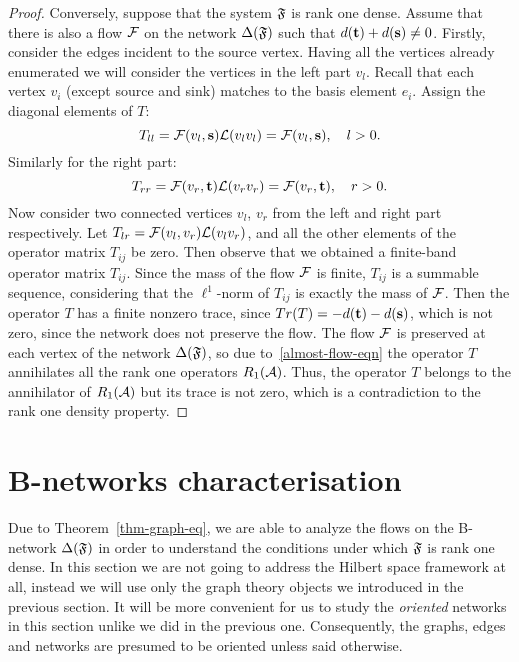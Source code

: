\documentclass[12pt,oneside,a4paper]{amsart}
\begin{document}
\begin{proof}
        Conversely, suppose that the system $\fsys$ is rank one dense.
        Assume that there is also a flow $\flow$ on the network $\net(\fsys)$ such that $d(\sink) + d(\source) \neq 0$.
        Firstly, consider the edges incident to the source vertex.
        Having all the vertices already enumerated we will consider the vertices in the left part $v_{l}$.
        Recall that each vertex $v_i$ (except source and sink) matches to the basis element $e_i$.
        Assign the diagonal elements of $T$:
        \[
          T_{ll} = \flow(v_l, \source) \len(v_l v_l) = \flow(v_l, \source), \quad l > 0.
        \]
        Similarly for the right part:
        \[
          T_{rr} = \flow(v_r, \sink) \len(v_r v_r) = \flow(v_r, \sink), \quad r > 0.
        \]
        Now consider two connected vertices $v_l$, $v_r$ from the left and right part respectively.
        Let $T_{lr} = \flow(v_l, v_r) \len(v_l  v_r)$,
        and all the other elements of the operator matrix $T_{ij}$ be zero.
        Then observe that we obtained a finite-band operator matrix $T_{ij}$.
        Since the mass of the flow $\flow$ is finite, $T_{ij}$ is a summable sequence, considering that
          the $\ell^1$-norm of $T_{ij}$ is exactly the mass of $\flow$.
        Then the operator $T$ has a finite nonzero trace, since $Tr(T) = -d(\sink) - d(\source)$, which is not zero,
          since the network does not preserve the flow.
        The flow $\flow$ is preserved at each vertex of the network $\net(\fsys)$, so due to~\eqref{almost-flow-eqn}
          the operator $T$ annihilates all the rank one operators $R_1(\cal{A})$.
        Thus, the operator $T$ belongs to the annihilator of $R_1(\cal{A})$ but its trace is not zero,
          which is a contradiction to the rank one density property.
      \end{proof}

  \bigskip
  \section{B-networks characterisation}
    \label{sec:char}
    Due to Theorem~\ref{thm-graph-eq}, we are able to analyze the flows on the B-network
      $\net(\fsys)$ in order to understand the conditions under which $\fsys$ is rank one dense.
    In this section we are not going to address the Hilbert space framework at all,
      instead we will use only the graph theory objects we introduced in the previous section.
    It will be more convenient for us to study the \emph{oriented} networks in this section unlike we
      did in the previous one.
    Consequently, the graphs, edges and networks are presumed to be oriented unless said otherwise.
\end{document}
